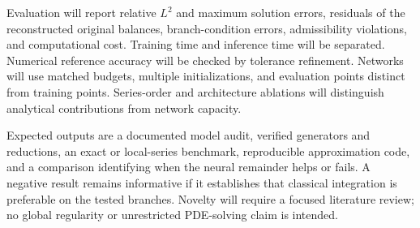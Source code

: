 \documentclass[12pt,a4paper]{article}
\begin{document}
Evaluation will report relative $L^2$ and maximum solution errors, residuals of the reconstructed original balances, branch-condition errors, admissibility violations, and computational cost. Training time and inference time will be separated. Numerical reference accuracy will be checked by tolerance refinement. Networks will use matched budgets, multiple initializations, and evaluation points distinct from training points. Series-order and architecture ablations will distinguish analytical contributions from network capacity.

Expected outputs are a documented model audit, verified generators and reductions, an exact or local-series benchmark, reproducible approximation code, and a comparison identifying when the neural remainder helps or fails. A negative result remains informative if it establishes that classical integration is preferable on the tested branches. Novelty will require a focused literature review; no global regularity or unrestricted PDE-solving claim is intended.
\end{document}

